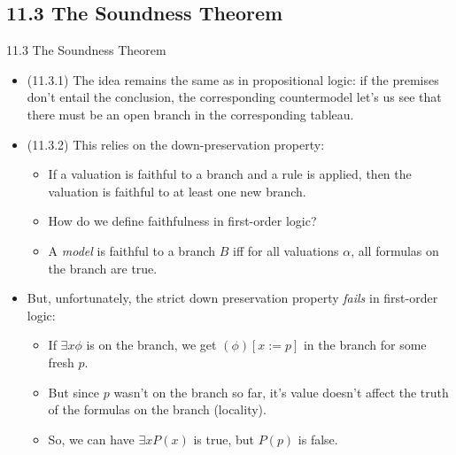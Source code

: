 \subsection{11.3 The Soundness Theorem}

\begin{frame}{11.3 The Soundness Theorem}

  \begin{itemize}
  \item (11.3.1) The idea remains the same as in propositional logic:
    if the premises don't entail the conclusion, the corresponding
    countermodel let's us see that there must be an open branch in the
    corresponding tableau.

  \item (11.3.2) This relies on the down-preservation property:

    \begin{itemize}
    \item If a valuation is faithful to a branch and a rule is
      applied, then the valuation is faithful to at least one new
      branch.
    \item How do we define faithfulness in first-order logic?

      \item A \emph{model} is faithful to a branch $B$ iff for all
        valuations $\alpha$, all formulas on the branch are true.
    \end{itemize}

    \item But, unfortunately, the strict down preservation property
      \emph{fails} in first-order logic:
      \begin{itemize}
      \item If $\exists x\phi$ is on the branch, we get $(\phi)[x:=p]$
        in the branch for some fresh $p$.

      \item But since $p$ wasn't on the branch so far, it's value
        doesn't affect the truth of the formulas on the branch
        (locality).
        \item So, we can have $\exists xP(x)$ is true, but $P(p)$ is false.
      \end{itemize}
  \end{itemize}
  
\end{frame}

